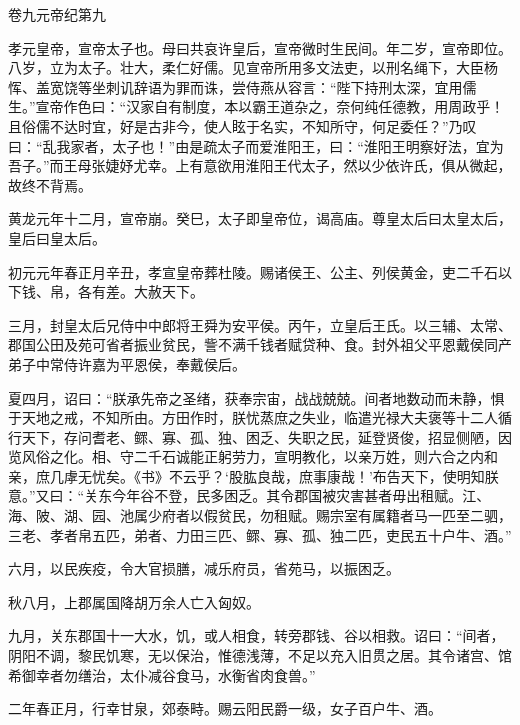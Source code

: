 \documentclass[12pt,UTF8]{ctexbook}
\begin{document}
卷九元帝纪第九



孝元皇帝，宣帝太子也。母曰共哀许皇后，宣帝微时生民间。年二岁，宣帝即位。八岁，立为太子。壮大，柔仁好儒。见宣帝所用多文法吏，以刑名绳下，大臣杨恽、盖宽饶等坐刺讥辞语为罪而诛，尝侍燕从容言：“陛下持刑太深，宜用儒生。”宣帝作色曰：“汉家自有制度，本以霸王道杂之，奈何纯任德教，用周政乎！且俗儒不达时宜，好是古非今，使人眩于名实，不知所守，何足委任？”乃叹曰：“乱我家者，太子也！”由是疏太子而爱淮阳王，曰：“淮阳王明察好法，宜为吾子。”而王母张婕妤尤幸。上有意欲用淮阳王代太子，然以少依许氏，俱从微起，故终不背焉。



黄龙元年十二月，宣帝崩。癸巳，太子即皇帝位，谒高庙。尊皇太后曰太皇太后，皇后曰皇太后。



初元元年春正月辛丑，孝宣皇帝葬杜陵。赐诸侯王、公主、列侯黄金，吏二千石以下钱、帛，各有差。大赦天下。



三月，封皇太后兄侍中中郎将王舜为安平侯。丙午，立皇后王氏。以三辅、太常、郡国公田及苑可省者振业贫民，訾不满千钱者赋贷种、食。封外祖父平恩戴侯同产弟子中常侍许嘉为平恩侯，奉戴侯后。



夏四月，诏曰：“朕承先帝之圣绪，获奉宗宙，战战兢兢。间者地数动而未静，惧于天地之戒，不知所由。方田作时，朕忧蒸庶之失业，临遣光禄大夫褒等十二人循行天下，存问耆老、鳏、寡、孤、独、困乏、失职之民，延登贤俊，招显侧陋，因览风俗之化。相、守二千石诚能正躬劳力，宣明教化，以亲万姓，则六合之内和亲，庶几虖无忧矣。《书》不云乎？‘股肱良哉，庶事康哉！’布告天下，使明知朕意。”又曰：“关东今年谷不登，民多困乏。其令郡国被灾害甚者毋出租赋。江、海、陂、湖、园、池属少府者以假贫民，勿租赋。赐宗室有属籍者马一匹至二驷，三老、孝者帛五匹，弟者、力田三匹、鳏、寡、孤、独二匹，吏民五十户牛、酒。”



六月，以民疾疫，令大官损膳，减乐府员，省苑马，以振困乏。



秋八月，上郡属国降胡万余人亡入匈奴。



九月，关东郡国十一大水，饥，或人相食，转旁郡钱、谷以相救。诏曰：“间者，阴阳不调，黎民饥寒，无以保治，惟德浅薄，不足以充入旧贯之居。其令诸宫、馆希御幸者勿缮治，太仆减谷食马，水衡省肉食兽。”



二年春正月，行幸甘泉，郊泰畤。赐云阳民爵一级，女子百户牛、酒。
\end{document}
